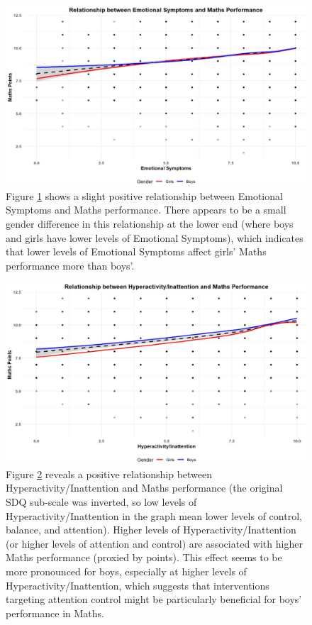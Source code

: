 \documentclass[12pt,a4paper,onecolumn]{article}
\numberwithin{equation}{section}
\begin{document}
\begin{figure}[ht] 
    \centering
    \includegraphics[width=1\linewidth]{production_function_maths_emosym.JPG}
    \caption{Figure \ref{fig:emosym_maths} shows a slight positive relationship between Emotional Symptoms and Maths performance. There appears to be a small gender difference in this relationship at the lower end (where boys and girls have lower levels of Emotional Symptoms), which indicates that lower levels of Emotional Symptoms affect girls' Maths performance more than boys'.}
    \label{fig:emosym_maths}
\end{figure}

\begin{figure}[ht] 
    \centering
    \includegraphics[width=1\linewidth]{production_function_maths_hyper.JPG}
    \caption{Figure \ref{fig:hyper_maths} reveals a positive relationship between Hyperactivity/Inattention and Maths performance (the original SDQ sub-scale was inverted, so low levels of Hyperactivity/Inattention in the graph mean lower levels of control, balance, and attention). Higher levels of Hyperactivity/Inattention (or higher levels of attention and control) are associated with higher Maths performance (proxied by points). This effect seems to be more pronounced for boys, especially at higher levels of Hyperactivity/Inattention, which suggests that interventions targeting attention control might be particularly beneficial for boys' performance in Maths.}
    \label{fig:hyper_maths}
\end{figure}
\end{document}
